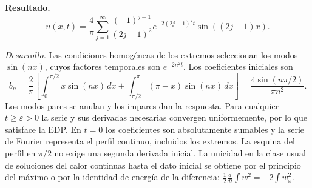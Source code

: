 \noindent\textbf{Resultado.} \[u(x,t)=\frac4\pi\sum_{j=1}^{\infty}\frac{(-1)^{j+1}}{(2j-1)^2}e^{-2(2j-1)^2t}\sin((2j-1)x).\]

\noindent\textit{Desarrollo.} Las condiciones homogéneas de los extremos seleccionan los modos $\sin(nx)$, cuyos factores temporales son $e^{-2n^2t}$. Los coeficientes iniciales son \[b_n=\frac2\pi\left[\int_0^{\pi/2}x\sin(nx)\,dx+\int_{\pi/2}^{\pi}(\pi-x)\sin(nx)\,dx\right]=\frac{4\sin(n\pi/2)}{\pi n^2}.\] Los modos pares se anulan y los impares dan la respuesta. Para cualquier $t\ge\varepsilon>0$ la serie y sus derivadas necesarias convergen uniformemente, por lo que satisface la EDP. En $t=0$ los coeficientes son absolutamente sumables y la serie de Fourier representa el perfil continuo, incluidos los extremos. La esquina del perfil en $\pi/2$ no exige una segunda derivada inicial. La unicidad en la clase usual de soluciones del calor continuas hasta el dato inicial se obtiene por el principio del máximo o por la identidad de energía de la diferencia: $\frac12\frac d{dt}\int w^2=-2\int w_x^2$.
